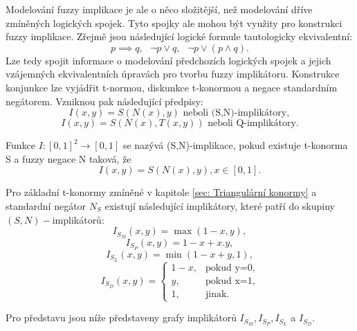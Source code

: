 Modelov\'an\'i fuzzy implikace je ale o něco složitější, než modelov\'an\'i dříve zmíněných logických spojek. Tyto spojky ale mohou být využity pro konstrukci fuzzy implikace. Zřejmě jsou následující logické formule tautologicky ekvivalentní: $$ p\implies q, \mbox{   } \neg p \vee q, \mbox{   } \neg p\vee (p\wedge q) .$$ Lze tedy spojit informace o modelov\'an\'i p\v redchozích logických spojek a jejich vzájemných ekvivalentních \' upravách pro tvorbu fuzzy implikátoru. Konstrukce konjunkce lze vyjádřit t-normou, diskunkce t-konormou a negace standardn\'im negátorem. Vzniknou pak n\'asleduj\'ic\'i p\v redpisy:
$$I(x,y)=S(N(x),y)\text{ neboli (S,N)-implikátory},$$
$$I(x,y)=S(N(x),T(x,y)) \text{ neboli Q-implikátory}.$$

\begin{definition}
    \cite{Springer}
    Funkce $I: [0,1]^2 \rightarrow [0,1]$ se nazývá (S,N)-implikace, pokud existuje t-konorma S a fuzzy negace N taková, že $$I(x,y) = S(N(x),y), x \in [0,1].$$
\end{definition}

\begin{example}
\cite{Springer}
Pro základní t-konormy zmíněné v kapitole \ref{sec: Triangulární konormy} a standardní negátor $N_S$ existují následující implikátory, které patří do skupiny $(S,N)-$implikátor\r u:\\
    \vbox{$$ I_{S_M}(x,y)=\max(1-x,y),$$ }
\vbox{$$ I_{S_P}(x,y)=1-x+x.y,$$}
 \vbox{$$ I_{S_L}(x,y)=\min(1-x+y,1),$$}
 $$ I_{S_D}(x,y)=\begin{cases} 1-x,
&\mbox {pokud y=0,} \\y, &\mbox {pokud x=1}, \\
1, &\mbox {jinak.} \end{cases} $$
\end{example}

Pro představu jsou níže představeny grafy implikátorů $I_{S_M}, I_{S_P}, I_{S_L}$ a $I_{S_D}.$


